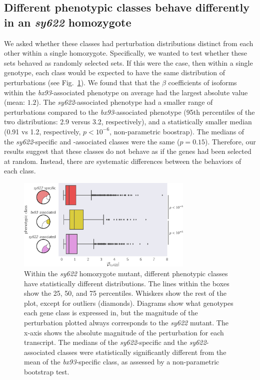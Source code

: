 \documentclass[10pt, twocolumn]{article}
\begin{document}
\subsection*{Different phenotypic classes behave differently in an
            \emph{sy622} homozygote}
We asked whether these classes had perturbation distributions distinct from each
other within a single homozygote. Specifically, we wanted to test whether these
sets behaved as randomly selected sets. If this were the case, then within a
single genotype, each class would be expected to have the same distribution
of perturbations (see Fig.~\ref{fig:classes}). We
found that that the $\beta$ coefficients of isoforms within the
\emph{bx93}-associated phenotype on average had the largest absolute value (mean:
$1.2$). The \emph{sy622}-associated phenotype had a smaller range of
perturbations compared to the \emph{bx93}-associated phenotype (95th percentiles
of the two distributions: 2.9 versus 3.2, respectively), and a statistically
smaller median (0.91 vs 1.2, respectively, $p < 10^{-6}$, non-parametric
boostrap). The medians of the \emph{sy622}-specific and -associated classes were
the same ($p=0.15$). Therefore, our results suggest that these classes do not
behave as if the genes had been selected at random. Instead, there are systematic
differences between the behaviors of each class.

\begin{figure}
  \centering{}
  \includegraphics[width=0.75\textwidth]{../figs/dpy22_classes.pdf}
  \caption{
    Within the \emph{sy622} homozygote mutant, different phenotypic classes have
    statistically different distributions. The lines
    within the boxes show the 25, 50, and 75 percentiles. Whiskers show the rest
    of the plot, except for outliers (diamonds). Diagrams show what genotypes each
    gene class is expressed in, but the magnitude of the perturbation plotted
    always corresponds to the \emph{sy622} mutant. The x-axis shows the absolute
    magnitude of the perturbation for each transcript.
    The medians of the \emph{sy622}-specific and the \emph{sy622}-associated
    classes were statistically significantly different from the mean of the
    \emph{bx93}-specific class, as assessed by a non-parametric bootstrap test.
  }
\label{fig:classes}
\end{figure}
\end{document}
